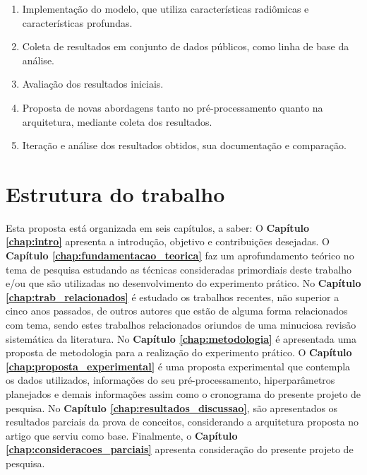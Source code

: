 \begin{enumerate}

\item Implementação do modelo, que utiliza características radiômicas e
características profundas.

\item Coleta de resultados em conjunto de dados públicos, como linha de base da análise.

\item Avaliação dos resultados iniciais.

\item Proposta de novas abordagens tanto no pré-processamento quanto na arquitetura, mediante coleta dos resultados.

\item Iteração e análise dos resultados obtidos, sua documentação e comparação.
\end{enumerate}

\section{Estrutura do trabalho}
\label{sec:cap1_estrutura_trabalho}

Esta proposta está organizada em seis capítulos, a saber:
O \textbf{Capítulo \ref{chap:intro}} apresenta a introdução, objetivo e contribuições desejadas. O \textbf{Capítulo \ref{chap:fundamentacao_teorica}} faz um aprofundamento teórico no tema de pesquisa estudando as técnicas consideradas primordiais deste trabalho e/ou que são utilizadas no desenvolvimento do experimento prático. No \textbf{Capítulo \ref{chap:trab_relacionados}} é estudado  os trabalhos recentes, não superior a cinco anos passados, de outros autores que estão de alguma forma relacionados com tema, sendo estes trabalhos relacionados oriundos de uma minuciosa revisão sistemática da literatura. No \textbf{Capítulo \ref{chap:metodologia}} é apresentada uma proposta de metodologia para a realização do experimento prático. O \textbf{Capítulo \ref{chap:proposta_experimental}} é uma proposta experimental que contempla os dados utilizados, informações do seu pré-processamento, hiperparâmetros planejados e demais informações assim como o cronograma do presente projeto de pesquisa. No \textbf{Capítulo \ref{chap:resultados_discussao}}, são apresentados os resultados parciais da prova de conceitos, considerando a arquitetura proposta no artigo que serviu como base. Finalmente, o \textbf{Capítulo \ref{chap:consideracoes_parciais}} apresenta consideração do presente projeto de pesquisa.

